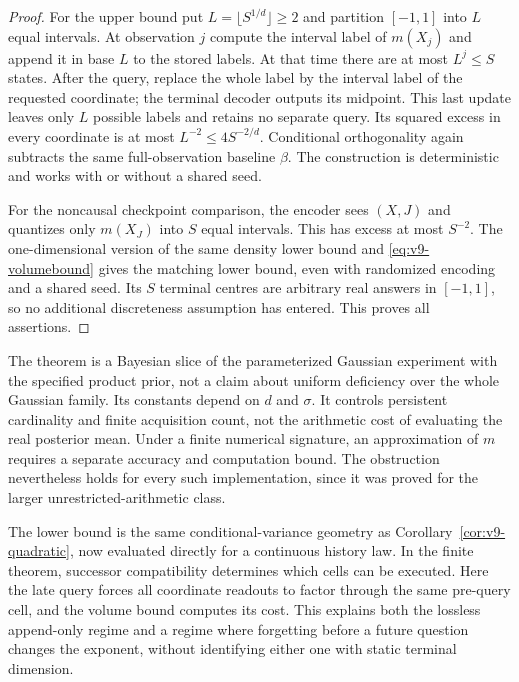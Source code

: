 \begin{proof}
For the upper bound put $L=\lfloor S^{1/d}\rfloor\ge2$ and partition
$[-1,1]$ into $L$ equal intervals. At observation $j$ compute the interval
label of $m(X_j)$ and append it in base $L$ to the stored labels. At that
time there are at most $L^j\le S$ states. After the query, replace the
whole label by the interval label of the requested coordinate; the
terminal decoder outputs its midpoint. This last update leaves only
$L$ possible labels and retains no separate query. Its squared excess
in every coordinate is at most $L^{-2}\le4S^{-2/d}$. Conditional
orthogonality again subtracts the same full-observation baseline $\beta$.
The construction is deterministic and works with or without a shared
seed.

For the noncausal checkpoint comparison, the encoder sees $(X,J)$ and
quantizes only $m(X_J)$ into $S$ equal intervals. This has excess at most
$S^{-2}$. The one-dimensional version of the same density lower bound
and \eqref{eq:v9-volumebound} gives the matching lower bound, even with
randomized encoding and a shared seed. Its $S$ terminal centres are
arbitrary real answers in $[-1,1]$, so no additional discreteness
assumption has entered. This proves all assertions.
\end{proof}

The theorem is a Bayesian slice of the parameterized Gaussian experiment
with the specified product prior, not a claim about uniform deficiency
over the whole Gaussian family. Its constants depend on $d$ and
$\sigma$. It controls persistent cardinality and finite acquisition
count, not the arithmetic cost of evaluating the real posterior mean.
Under a finite numerical signature, an approximation of $m$ requires a
separate accuracy and computation bound. The obstruction nevertheless
holds for every such implementation, since it was proved for the larger
unrestricted-arithmetic class.

The lower bound is the same conditional-variance geometry as
Corollary~\ref{cor:v9-quadratic}, now evaluated directly for a continuous
history law. In the finite theorem, successor compatibility determines
which cells can be executed. Here the late query forces all coordinate
readouts to factor through the same pre-query cell, and the volume bound
computes its cost. This explains both the lossless append-only regime
and a regime where forgetting before a future question changes the
exponent, without identifying either one with static terminal dimension.

